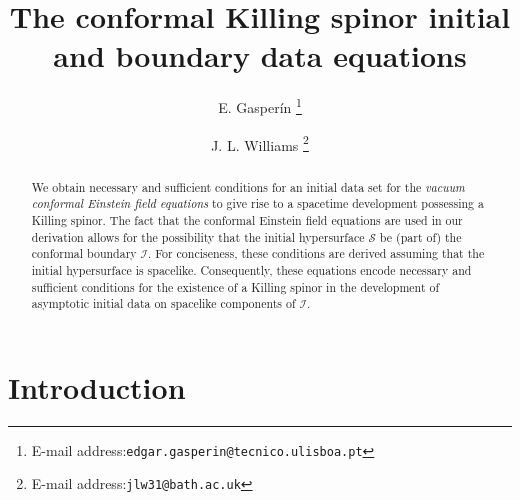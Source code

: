 \documentclass[10pt,a4paper]{article}
\theoremstyle{plain}
\begin{document}
\title{\textbf{The conformal Killing spinor initial and boundary data equations}}


\author[1]{E. Gasper\'in \footnote{E-mail address:{\tt edgar.gasperin@tecnico.ulisboa.pt}}}
\author[2]{J. L. Williams \footnote{E-mail address:{\tt jlw31@bath.ac.uk}}}



\maketitle
\begin{abstract}
  We obtain necessary and sufficient conditions for an initial data
  set for the \emph{vacuum conformal Einstein field equations} to give
  rise to a spacetime development possessing a Killing spinor.  The
  fact that the conformal Einstein field equations are used in our
  derivation allows for the possibility that the initial hypersurface
  $\mathcal{S}$ be (part of) the conformal boundary $\mathscr{I}$.
  For conciseness, these conditions are derived assuming that the
  initial hypersurface is spacelike. Consequently, these equations
  encode necessary and sufficient conditions for the existence of a
  Killing spinor in the development of asymptotic initial data on
  spacelike components of $\mathscr{I}$.
\end{abstract}


\section{Introduction}
\label{sec:Introduction}
\end{document}
